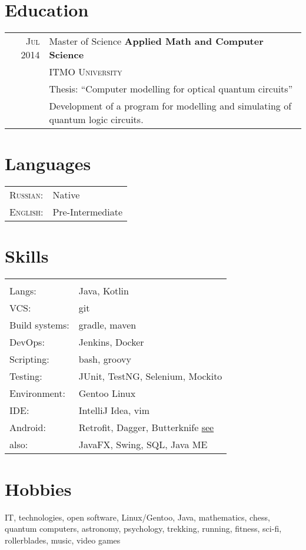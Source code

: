 \documentclass[a4paper,11pt]{article}
\begin{document}
\section{Education}
	\begin{tabular}{rl}	
	  \textsc{Jul 2014} & Master of Science \textbf{ Applied Math and Computer Science} \\& \textsc{ITMO University}\\
			& Thesis: ``Computer modelling for optical quantum circuits''\\&
			Development of a program for modelling and simulating of quantum logic circuits.
	\end{tabular}

\section{Languages}
	\begin{tabular}{ll}
		\textsc{Russian:}&Native\\
		\textsc{English:}&Pre-Intermediate\\
	\end{tabular}

\section{Skills}
	\begin{tabular}{ll}
		\multicolumn{2}{c}{} \\
			Langs: 		& Java, Kotlin \\
			VCS: 		& git \\
			Build systems: 	& gradle, maven \\
			DevOps:		& Jenkins, Docker \\
			Scripting: 	& bash, groovy \\ 
			Testing: 	& JUnit, TestNG, Selenium, Mockito\\
			Environment: 	& Gentoo Linux \\
			IDE: 		& IntelliJ Idea, vim \\
			Android:	& Retrofit, Dagger, Butterknife \href{https://github.com/dbudyak/old_android_shit}{see} \\
			also: 		& JavaFX, Swing, SQL, Java ME
	\end{tabular}

\section{Hobbies}
	IT, technologies, open software, Linux/Gentoo, Java, mathematics, chess, quantum computers, astronomy, 
	psychology, trekking, running, fitness, sci-fi, rollerblades, music, video games
\end{document}
